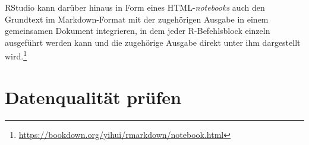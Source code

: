 RStudio kann darüber hinaus in Form eines HTML-\emph{notebooks} auch den Grundtext im Markdown-Format mit der zugehörigen Ausgabe in einem gemeinsamen Dokument integrieren, in dem jeder R-Befehlsblock einzeln ausgeführt werden kann und die zugehörige Ausgabe direkt unter ihm dargestellt wird.\footnote{\url{https://bookdown.org/yihui/rmarkdown/notebook.html}}

\section{Datenqualität prüfen}
\label{sec:tidyData}

